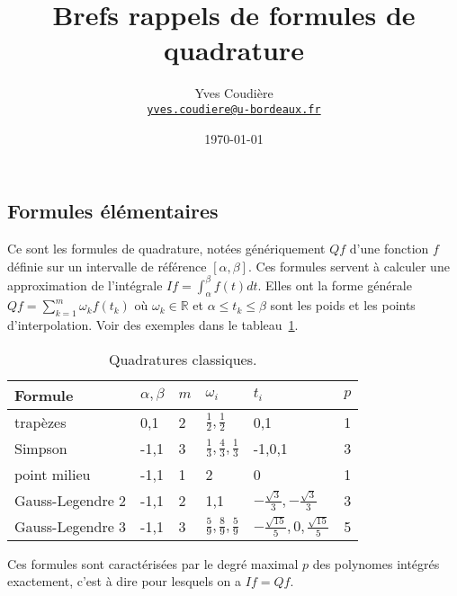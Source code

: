 \documentclass[a4paper,11pt,twoside]{article}
\title{Brefs rappels de formules de quadrature}
\author{
  Yves Coudière\\\href{mailto:yves.coudiere@u-bordeaux.fr}{\small\tt yves.coudiere@u-bordeaux.fr}
}
\date{\today} %
\def \rr {{\mathbb R}} %
\begin{document}
\maketitle %

\subsection*{Formules élémentaires}
Ce sont les formules de quadrature, notées génériquement $Qf$ d'une
fonction $f$ définie sur un intervalle de référence
$[\alpha,\beta]$. Ces formules servent à calculer une approximation de
l'intégrale $If = \int_\alpha^\beta f(t) dt$. Elles ont la forme
générale $Qf = \sum_{k=1}^m \omega_kf(t_k)$ où $\omega_k\in\rr$ et
$\alpha\le t_k \le \beta$ sont les poids et les points
d'interpolation. Voir des exemples dans le tableau~\ref{tab:quad}.
\begin{table}
  \centering
  \begin{tabular}{llllll}\toprule
    Formule & $\alpha,\beta$ & $m$ & $\omega_i$ & $t_i$ & $p$ \\
    \midrule
    trapèzes     &  0,1 & 2 & $\frac12,\frac12$ & 0,1 & 1 \\
    Simpson      & -1,1 & 3 & $\frac13,\frac43,\frac13$ & -1,0,1 & 3
    \\
    point milieu & -1,1 & 1 & 2                   & 0   & 1 \\
    Gauss-Legendre 2 & -1,1 & 2 & 1,1 & $-\frac{\sqrt{3}}3,
                                        -\frac{\sqrt{3}}3$ & 3 \\
    Gauss-Legendre 3 & -1,1 & 3 & $\frac59,\frac89,\frac59$ &
                                                                  $-\frac{\sqrt{15}}5,0,\frac{\sqrt{15}}5$
                                                        & 5 
    \\ \bottomrule
  \end{tabular}
  \caption{Quadratures classiques.}
  \label{tab:quad}
\end{table}

Ces formules sont caractérisées par le degré maximal $p$ des polynomes
intégrés exactement, c'est à dire pour lesquels on a $If = Qf$.
\end{document}
